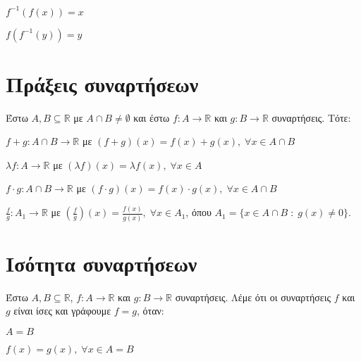 \documentclass[a4paper,table]{report}
\begin{document}
\begin{prop}[Ιδιότητες]
\item {}
  \begin{myitemize}
    \item $ f^{-1}(f(x))= x $
    \item $ f(f^{-1}(y))= y $
  \end{myitemize}
\end{prop}


\section{Πράξεις συναρτήσεων}

\begin{dfn}
  Έστω $ A, B \subseteq \mathbb{R} $ με $ A \cap B \neq \emptyset $ και έστω $ f
  \colon A \to \mathbb{R} $ και $ g \colon B \to \mathbb{R} $ συναρτήσεις. Τότε:
  \begin{myitemize}
    \item $ f+g \colon A \cap B \to \mathbb{R} $ με 
      $ (f+g)(x)= f(x)+g(x), \; \forall x \in A \cap B $
    \item $ \lambda f \colon A \to \mathbb{R} $ με 
      $ (\lambda f)(x)= \lambda f(x), \; \forall x \in A $
    \item $ f\cdot g \colon A \cap B \to \mathbb{R} $ με 
      $ (f\cdot g)(x)= f(x)\cdot g(x), \; \forall x \in A \cap B $
    \item  $ \frac{f}{g} \colon A_{1} \to \mathbb{R} $ με 
      $ \left(\frac{f}{g}\right)(x)= \frac{f(x)}{g(x)}, \; \forall x \in A_{1} $,
      όπου $ A_{1} = \{ x \in A \cap B \; : \; g(x) \neq 0 \} $.
  \end{myitemize}
\end{dfn}

\section{Ισότητα συναρτήσεων}

\begin{dfn}
  Έστω $ A, B \subseteq \mathbb{R} $, $ f \colon A \to \mathbb{R} $ και 
  $ g \colon B \to \mathbb{R} $ συναρτήσεις. Λέμε ότι οι συναρτήσεις $f$ και $g$ είναι
  ίσες και γράφουμε $ f=g $, όταν: 
  \begin{myitemize}
    \item $ A=B $
    \item $f(x) = g(x), \; \forall x \in A = B $
  \end{myitemize}
\end{dfn}
\end{document}
